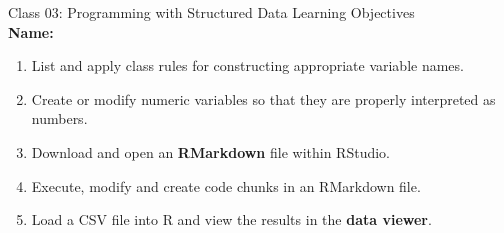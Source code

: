 \documentclass[11pt]{article}
\date{2018-07-01}                                           %
\begin{document}
{\Large \textcolor{oiB}{
Class 03: Programming with Structured Data
\hfill Learning Objectives}} \\

\textbf{Name:} \underline{\hspace{6cm}} \\

\vspace{0.2cm}

\begin{enumerate}
\renewcommand\labelenumi{\textcolor{light}{\textbf{LO \theenumi.}}}

\item List and apply class rules for constructing appropriate variable names.

\item Create or modify numeric variables so that they are properly interpreted
as numbers.

\item Download and open an \textbf{RMarkdown} file within RStudio.

\item Execute, modify and create code chunks in an RMarkdown file.

\item Load a CSV file into R and view the results in the \textbf{data viewer}.

\end{enumerate}

\noindent\makebox[\linewidth]{\rule{1.1\textwidth}{0.4pt}}
\end{document}
